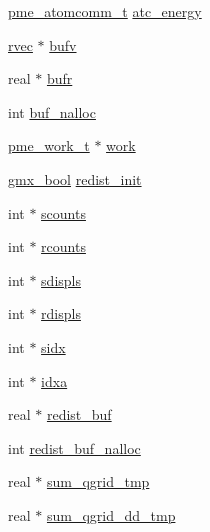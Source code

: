 \begin{DoxyCompactItemize}
\hyperlink{structpme__atomcomm__t}{pme\-\_\-atomcomm\-\_\-t} \hyperlink{structgmx__pme_aa8a05cceb80bf94695bcdd1d5bb2c126}{atc\-\_\-energy}
\item 
\hyperlink{share_2template_2gromacs_2types_2simple_8h_aa02a552a4abd2f180c282a083dc3a999}{rvec} $\ast$ \hyperlink{structgmx__pme_a746e7340cbc7a22975b16f1a6116cb9a}{bufv}
\item 
real $\ast$ \hyperlink{structgmx__pme_ac1ad765397dfb9b4454b7eaf3ceca5cb}{bufr}
\item 
int \hyperlink{structgmx__pme_a683423b944b1f866908a4587c77530ac}{buf\-\_\-nalloc}
\item 
\hyperlink{structpme__work__t}{pme\-\_\-work\-\_\-t} $\ast$ \hyperlink{structgmx__pme_af744909d4c4df36cd2e9a7326a1d9f58}{work}
\item 
\hyperlink{include_2types_2simple_8h_a8fddad319f226e856400d190198d5151}{gmx\-\_\-bool} \hyperlink{structgmx__pme_afec709d7f218d2a2eb1a46bdb908f3ae}{redist\-\_\-init}
\item 
int $\ast$ \hyperlink{structgmx__pme_ad2082a0a9d0d6437c8d1326bb7914810}{scounts}
\item 
int $\ast$ \hyperlink{structgmx__pme_a7245e9b4bac7b76cdbb129fd3651db7d}{rcounts}
\item 
int $\ast$ \hyperlink{structgmx__pme_a515081430b215e866bafa6384bd61569}{sdispls}
\item 
int $\ast$ \hyperlink{structgmx__pme_a1c6a5c2c7b116fa65e4902a4a677c9e7}{rdispls}
\item 
int $\ast$ \hyperlink{structgmx__pme_a776acbaf7e46489915096c277b78e110}{sidx}
\item 
int $\ast$ \hyperlink{structgmx__pme_afdc9b59809619a10d4f78aa981e95ab5}{idxa}
\item 
real $\ast$ \hyperlink{structgmx__pme_a92834d86dabbae326292f05b6b5a2e98}{redist\-\_\-buf}
\item 
int \hyperlink{structgmx__pme_a51579912cc5a929fb87a942c9f83f1c6}{redist\-\_\-buf\-\_\-nalloc}
\item 
real $\ast$ \hyperlink{structgmx__pme_ae9688511d951a97627c307028c008dec}{sum\-\_\-qgrid\-\_\-tmp}
\item 
real $\ast$ \hyperlink{structgmx__pme_aa315fdf92af473f2da345dba407f4442}{sum\-\_\-qgrid\-\_\-dd\-\_\-tmp}
\end{DoxyCompactItemize}


